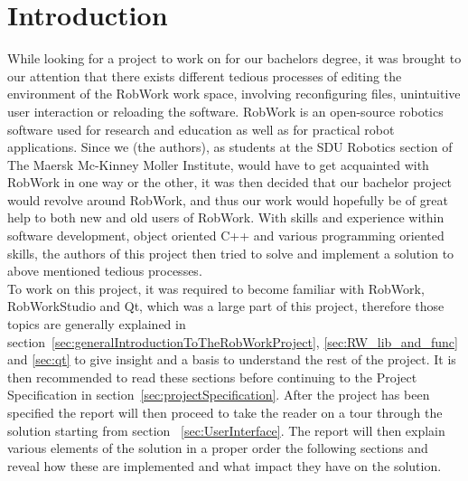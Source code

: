 
\section{Introduction}

While looking for a project to work on for our bachelors degree, it was brought to our attention that there exists different tedious processes of editing the environment of the RobWork work space, involving reconfiguring files, unintuitive user interaction or reloading the software. RobWork is an open-source robotics software used for research and education as well as for practical robot applications. Since we (the authors), as students at the SDU Robotics section of The Maersk Mc-Kinney Moller Institute, would have to get acquainted with RobWork in one way or the other, it was then decided that our bachelor project would revolve around RobWork, and thus our work would hopefully be of great help to both new and old users of RobWork. With skills and experience within software development, object oriented C++ and various programming oriented skills, the authors of this project then tried to solve and implement a solution to above mentioned tedious processes.\\

To work on this project, it was required to become familiar with RobWork, RobWorkStudio and Qt, which was a large part of this project, therefore those topics are generally explained in section~\ref{sec:generalIntroductionToTheRobWorkProject}, \ref{sec:RW_lib_and_func} and \ref{sec:qt} to give insight and a basis to understand the rest of the project. It is then recommended to read these sections before continuing to the Project Specification in section~\ref{sec:projectSpecification}. After the project has been specified the report will then proceed to take the reader on a tour through the solution starting from section ~\ref{sec:UserInterface}. The report will then explain various elements of the solution in a proper order the following sections and reveal how these are implemented and what impact they have on the solution.

\clearpage
